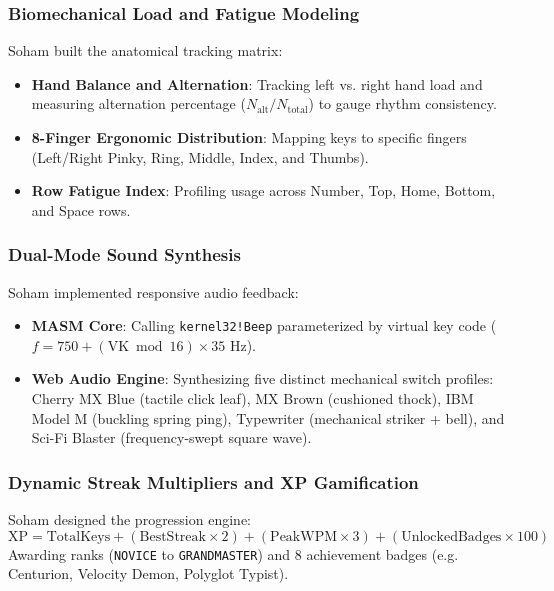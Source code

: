 \documentclass[11pt,a4paper]{article}
\begin{document}
\subsubsection{Biomechanical Load and Fatigue Modeling}
Soham built the anatomical tracking matrix:
\begin{itemize}[leftmargin=*]
  \item \textbf{Hand Balance and Alternation}: Tracking left vs. right hand load and measuring alternation percentage ($N_{\text{alt}} / N_{\text{total}}$) to gauge rhythm consistency.
  \item \textbf{8-Finger Ergonomic Distribution}: Mapping keys to specific fingers (Left/Right Pinky, Ring, Middle, Index, and Thumbs).
  \item \textbf{Row Fatigue Index}: Profiling usage across Number, Top, Home, Bottom, and Space rows.
\end{itemize}

\subsubsection{Dual-Mode Sound Synthesis}
Soham implemented responsive audio feedback:
\begin{itemize}[leftmargin=*]
  \item \textbf{MASM Core}: Calling \texttt{kernel32!Beep} parameterized by virtual key code ($f = 750 + (\text{VK} \bmod 16) \times 35\text{ Hz}$).
  \item \textbf{Web Audio Engine}: Synthesizing five distinct mechanical switch profiles: Cherry MX Blue (tactile click leaf), MX Brown (cushioned thock), IBM Model M (buckling spring ping), Typewriter (mechanical striker + bell), and Sci-Fi Blaster (frequency-swept square wave).
\end{itemize}

\subsubsection{Dynamic Streak Multipliers and XP Gamification}
Soham designed the progression engine:
\begin{equation}
  \text{XP} = \text{TotalKeys} + (\text{BestStreak} \times 2) + (\text{PeakWPM} \times 3) + (\text{UnlockedBadges} \times 100)
\end{equation}
Awarding ranks (\texttt{NOVICE} to \texttt{GRANDMASTER}) and 8 achievement badges (e.g. Centurion, Velocity Demon, Polyglot Typist).

\end{document}
